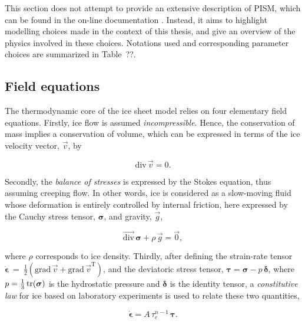 \documentclass{article}
\renewcommand{\div}[1]{\mathrm{div}\,#1}
\newcommand{\tensdiv}[1]{\vec{\mathrm{div}}\,#1}
\newcommand{\tensgrad}[1]{\bm{\mathrm{grad}}\,#1}
\begin{document}

This section does not attempt to provide an extensive description of PISM,
which can be found in the on-line documentation \citep{PISM-authors.2014}.
Instead, it aims to highlight modelling choices made in the context of this
thesis, and give an overview of the physics involved in these choices.
Notations used and corresponding parameter choices are summarized in Table~??.

\subsection{Field equations}

The thermodynamic core of the ice sheet model relies on four elementary field
equations. Firstly, ice flow is assumed \emph{incompressible}. Hence, the
conservation of mass implies a conservation of volume, which can be expressed
in terms of the ice velocity vector, $\vec{v}$, by

\begin{equation}
    \label{eqn:incompressibility}
    \div{\vec{v}} = 0.
\end{equation}

Secondly, the \emph{balance of stresses} is expressed by the Stokes equation,
thus assuming creeping flow. In other words, ice is considered as a slow-moving
fluid whose deformation is entirely controlled by internal friction, here
expressed by the Cauchy stress tensor, $\bm\sigma$, and gravity, $\vec{g}$,

\begin{equation}
    \label{eqn:stressbalance}
    \tensdiv{\bm\sigma} + \rho\,\vec{g} = \vec{0},
\end{equation}

where $\rho$ corresponds to ice density. Thirdly, after defining the
strain-rate tensor
${\bm{\dot\epsilon}~=~\frac{1}{2}(\tensgrad{\vec{v}} +
                                  \tensgrad{\vec{v}}^{\mathrm{T}})}$,
and the deviatoric stress tensor, ${\bm{\tau} = \bm{\sigma} - p\,\bm{\delta}}$,
where $p=\frac{1}{3}\tr(\bm{\sigma})$ is the hydrostatic pressure and
$\bm{\delta}$ is the identity tensor, a \emph{constitutive law} for ice based
on laboratory experiments is used to relate these two quantities,

\begin{equation}
    \label{eqn:glenslaw}
    \bm{\dot\epsilon} = A\,\tau_e^{n-1}\,\bm{\tau}.
\end{equation}
\end{document}
